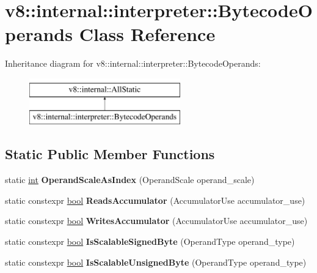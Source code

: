 \hypertarget{classv8_1_1internal_1_1interpreter_1_1BytecodeOperands}{}\section{v8\+:\+:internal\+:\+:interpreter\+:\+:Bytecode\+Operands Class Reference}
\label{classv8_1_1internal_1_1interpreter_1_1BytecodeOperands}
Inheritance diagram for v8\+:\+:internal\+:\+:interpreter\+:\+:Bytecode\+Operands\+:\begin{figure}[H]
\begin{center}
\leavevmode
\includegraphics[height=2.000000cm]{classv8_1_1internal_1_1interpreter_1_1BytecodeOperands}
\end{center}
\end{figure}
\subsection*{Static Public Member Functions}
\begin{DoxyCompactItemize}
\item 
\mbox{\label{classv8_1_1internal_1_1interpreter_1_1BytecodeOperands_aee6ac40afed3976794a9bb1859fe9c0c}} 
static \mbox{\hyperlink{classint}{int}} {\bfseries Operand\+Scale\+As\+Index} (Operand\+Scale operand\+\_\+scale)
\item 
\mbox{\label{classv8_1_1internal_1_1interpreter_1_1BytecodeOperands_ad44b8da8fe22c000d1d66e39cc38423d}} 
static constexpr \mbox{\hyperlink{classbool}{bool}} {\bfseries Reads\+Accumulator} (Accumulator\+Use accumulator\+\_\+use)
\item 
\mbox{\label{classv8_1_1internal_1_1interpreter_1_1BytecodeOperands_a5d0edbbbecf5081171a4cb067d078503}} 
static constexpr \mbox{\hyperlink{classbool}{bool}} {\bfseries Writes\+Accumulator} (Accumulator\+Use accumulator\+\_\+use)
\item 
\mbox{\label{classv8_1_1internal_1_1interpreter_1_1BytecodeOperands_a377d20c685dcf8ac4eff16f3d7ec8ea5}} 
static constexpr \mbox{\hyperlink{classbool}{bool}} {\bfseries Is\+Scalable\+Signed\+Byte} (Operand\+Type operand\+\_\+type)
\item 
\mbox{\label{classv8_1_1internal_1_1interpreter_1_1BytecodeOperands_ac0c62217cd8e6328c751ed4d02cd5f9a}} 
static constexpr \mbox{\hyperlink{classbool}{bool}} {\bfseries Is\+Scalable\+Unsigned\+Byte} (Operand\+Type operand\+\_\+type)
\end{DoxyCompactItemize}
